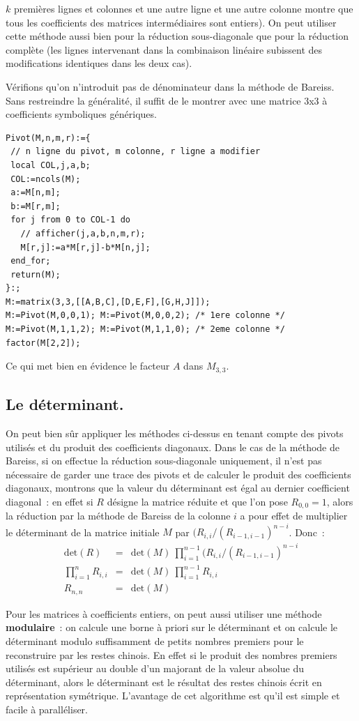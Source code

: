 \documentclass[a4paper,11pt]{book}
\begin{document}
\begin{giacjshere}
\begin{itemize}
$k$ premi\`eres lignes et colonnes et une autre ligne et une autre
colonne montre que tous les coefficients des matrices interm\'ediaires
sont entiers).
On peut utiliser cette méthode aussi bien pour la réduction
sous-diagonale que pour la réduction complète (les lignes
intervenant dans la combinaison linéaire subissent des 
modifications identiques dans les deux cas).
\end{itemize}
V\'erifions
qu'on n'introduit pas de dénominateur dans la méthode
de Bareiss. Sans
restreindre la généralité, il suffit de le montrer avec une
matrice 3x3 \`a coefficients symboliques génériques. 
\begin{verbatim}
Pivot(M,n,m,r):={ 
 // n ligne du pivot, m colonne, r ligne a modifier
 local COL,j,a,b; 
 COL:=ncols(M);
 a:=M[n,m];
 b:=M[r,m];
 for j from 0 to COL-1 do
   // afficher(j,a,b,n,m,r);
   M[r,j]:=a*M[r,j]-b*M[n,j];
 end_for;
 return(M);
}:; 
M:=matrix(3,3,[[A,B,C],[D,E,F],[G,H,J]]);
M:=Pivot(M,0,0,1); M:=Pivot(M,0,0,2); /* 1ere colonne */
M:=Pivot(M,1,1,2); M:=Pivot(M,1,1,0); /* 2eme colonne */
factor(M[2,2]);
\end{verbatim}
Ce qui met bien en évidence le facteur $A$ dans $M_{3,3}$.

\subsection{Le d\'eterminant.}
On peut bien sûr appliquer les m\'ethodes ci-dessus en tenant compte
des pivots utilisés et du produit des coefficients diagonaux. Dans le cas de 
la méthode de Bareiss, si on effectue la réduction sous-diagonale
uniquement, il n'est pas nécessaire de garder une trace des pivots
et de calculer le produit des coefficients diagonaux,
montrons que la valeur du d\'eterminant est égal au 
dernier coefficient diagonal~: en effet si $R$ désigne la matrice réduite et
que l'on pose $R_{0,0}=1$, alors la réduction par la méthode de
Bareiss de la colonne $i$ a pour effet de multiplier le déterminant 
de la matrice initiale $M$ par $(R_{i,i}/(R_{i-1,i-1})^{n-i}$. Donc~:
\begin{eqnarray*}
 \mbox{det}(R)&=&\mbox{det}(M) \ \prod_{i=1}^{n-1}
(R_{i,i}/(R_{i-1,i-1})^{n-i} \\
\prod_{i=1}^{n} R_{i,i}&=& \mbox{det}(M) \ \prod_{i=1}^{n-1} R_{i,i}  \\
R_{n,n} &=& \mbox{det}(M)
\end{eqnarray*}


Pour les matrices \`a coefficients entiers, on peut aussi utiliser une
m\'ethode 
{\bf modulaire}~:
on calcule une borne \`a priori sur le d\'eterminant
et on calcule le d\'eterminant modulo suffisamment de petits nombres
premiers pour le reconstruire par les restes chinois. En effet
si le produit des nombres premiers utilisés
est supérieur au double d'un majorant de la valeur absolue du
déterminant, alors le déterminant est le résultat des restes chinois
écrit en représentation symétrique.
L'avantage de cet algorithme est qu'il est simple et facile à paralléliser.


\end{giacjshere}
\end{document}
